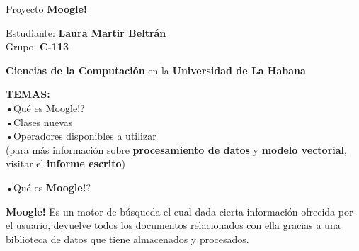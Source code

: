 \documentclass[11pt]{beamer}
\begin{document}


\begin{frame}{Proyecto \textbf{Moogle!}}
\begin{flushleft}
Estudiante: \textbf{Laura Martir Beltrán}\\
Grupo: \textbf{C-113}\\

\end{flushleft}
\begin{center}
\textbf{Ciencias de la Computación} en la \textbf{Universidad de La Habana}\\

\end{center}
\begin{center}
\textbf{TEMAS:}\\
•Qué es Moogle!?\\
•Clases nuevas\\
•Operadores disponibles a utilizar\\
(para más información sobre \textbf{procesamiento de datos} y \textbf{modelo vectorial}, visitar el \textbf{informe escrito})
\end{center}

\end{frame}
\begin{frame}{•Qué es \textbf{Moogle!}?}
\begin{center}
\textbf{Moogle!} Es un motor de búsqueda el cual dada cierta información ofrecida por el usuario, devuelve todos los documentos relacionados con ella gracias a una biblioteca de datos que tiene almacenados y procesados.
\end{center}
\end{frame}
\end{document}

